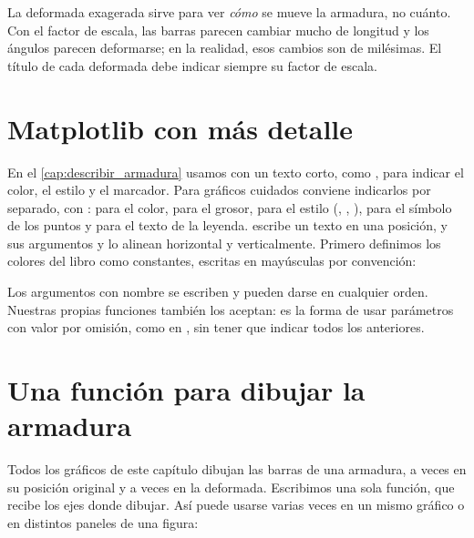 \begin{cuidado}
La deformada exagerada sirve para ver \emph{cómo} se mueve la armadura, no
cuánto. Con el factor de escala, las barras parecen cambiar mucho de
longitud y los ángulos parecen deformarse; en la realidad, esos cambios son
de milésimas. El título de cada deformada debe indicar siempre su factor de
escala.
\end{cuidado}

\section{Matplotlib con más detalle}\label{sec:matplotlib_detalle}

En el \cref{cap:describir_armadura} usamos  con un texto corto,
como , para indicar el color, el estilo y el marcador. Para gráficos
cuidados conviene indicarlos por separado, con
:  para el color,
 para el grosor,  para el estilo (,
, ),  para el símbolo de los puntos y 
para el texto de la leyenda.  escribe un texto en una posición, y
sus argumentos  y  lo alinean horizontal y verticalmente.
Primero definimos los colores del libro como constantes, escritas en
mayúsculas por convención:

\begin{python}
Los argumentos con nombre se escriben  y pueden darse en
cualquier orden. Nuestras propias funciones también los aceptan: es la forma
de usar parámetros con valor por omisión, como  en
, sin tener que indicar todos los anteriores.
\end{python}

\section{Una función para dibujar la armadura}\label{sec:dibujar_armadura}

Todos los gráficos de este capítulo dibujan las barras de una armadura, a
veces en su posición original y a veces en la deformada. Escribimos una sola
función, que recibe los ejes  donde dibujar. Así puede usarse varias
veces en un mismo gráfico o en distintos paneles de una figura:

